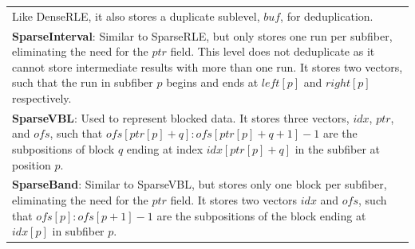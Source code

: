 \begin{table}[ht]
\begin{tabular}{p{14cm}}
    Like DenseRLE, it also stores a duplicate sublevel, $buf$, for deduplication. \\
    \textbf{SparseInterval}:
    Similar to SparseRLE, but only stores one run per subfiber, eliminating the need for the $ptr$ field.
    This level does not deduplicate as it cannot store intermediate results with more than one run.
    It stores two vectors, such that the run in subfiber $p$ begins and ends at $left[p]$ and $right[p]$ respectively. \\
    \textbf{SparseVBL}: Used to represent blocked data. It stores three vectors, $idx$, $ptr$, and $ofs$, such that $ofs[ptr[p] + q]:ofs[ptr[p] + q + 1] - 1$ are the subpositions of block $q$ ending at index $idx[ptr[p] + q]$ in the subfiber at position $p$. \\
    \textbf{SparseBand}: Similar to SparseVBL, but stores only one block per subfiber, eliminating the need for the $ptr$ field. It stores two vectors $idx$ and $ofs$, such that $ofs[p]:ofs[p + 1] - 1$ are the subpositions of the block ending at $idx[p]$ in subfiber $p$. \\


\end{tabular}
\end{table}
